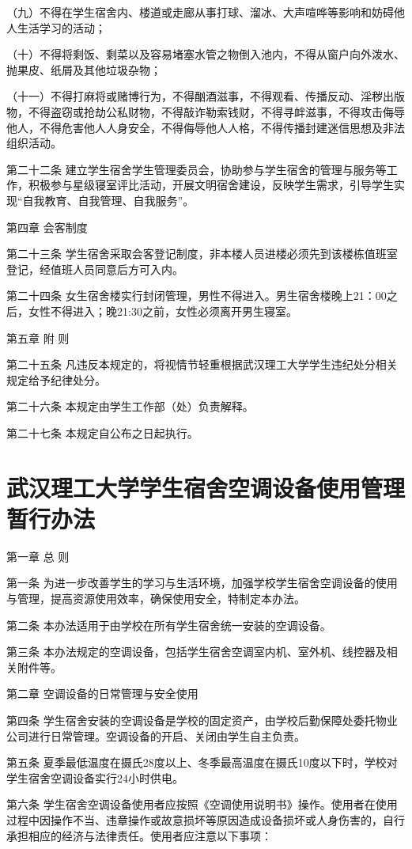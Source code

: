 \documentclass[UTF8,12pt,a4paper]{report}
\begin{document}
（九）不得在学生宿舍内、楼道或走廊从事打球、溜冰、大声喧哗等影响和妨碍他人生活学习的活动；

（十）不得将剩饭、剩菜以及容易堵塞水管之物倒入池内，不得从窗户向外泼水、抛果皮、纸屑及其他垃圾杂物；

（十一）不得打麻将或赌博行为，不得酗酒滋事，不得观看、传播反动、淫秽出版物，不得盗窃或抢劫公私财物，不得敲诈勒索钱财，不得寻衅滋事，不得攻击侮辱他人，不得危害他人人身安全，不得侮辱他人人格，不得传播封建迷信思想及非法组织活动。

第二十二条 建立学生宿舍学生管理委员会，协助参与学生宿舍的管理与服务等工作，积极参与星级寝室评比活动，开展文明宿舍建设，反映学生需求，引导学生实现“自我教育、自我管理、自我服务”。

第四章 会客制度

第二十三条 学生宿舍采取会客登记制度，非本楼人员进楼必须先到该楼栋值班室登记，经值班人员同意后方可入内。

第二十四条 女生宿舍楼实行封闭管理，男性不得进入。男生宿舍楼晚上21：00之后，女性不得进入；晚21:30之前，女性必须离开男生寝室。

第五章 附 则

第二十五条 凡违反本规定的，将视情节轻重根据武汉理工大学学生违纪处分相关规定给予纪律处分。

第二十六条 本规定由学生工作部（处）负责解释。

第二十七条 本规定自公布之日起执行。

\chapter{武汉理工大学学生宿舍空调设备使用管理暂行办法}
第一章 总 则

第一条 为进一步改善学生的学习与生活环境，加强学校学生宿舍空调设备的使用与管理，提高资源使用效率，确保使用安全，特制定本办法。

第二条 本办法适用于由学校在所有学生宿舍统一安装的空调设备。

第三条 本办法规定的空调设备，包括学生宿舍空调室内机、室外机、线控器及相关附件等。

第二章 空调设备的日常管理与安全使用

第四条 学生宿舍安装的空调设备是学校的固定资产，由学校后勤保障处委托物业公司进行日常管理。空调设备的开启、关闭由学生自主负责。

第五条 夏季最低温度在摄氏28度以上、冬季最高温度在摄氏10度以下时，学校对学生宿舍空调设备实行24小时供电。

第六条 学生宿舍空调设备使用者应按照《空调使用说明书》操作。使用者在使用过程中因操作不当、违章操作或故意损坏等原因造成设备损坏或人身伤害的，自行承担相应的经济与法律责任。使用者应注意以下事项：
\end{document}
